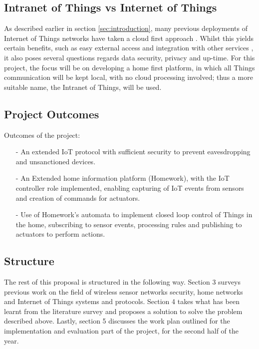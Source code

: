 \documentclass{mprop}
\begin{document}
\subsection{Intranet of Things vs Internet of Things} %
\label{sub:intranet_of_things}

As described earlier in section \ref{sec:introduction}, many previous deployments of Internet of Things networks have taken a cloud first approach \cite{SmartThings, Twine}. Whilst this yields certain benefits, such as easy external access and integration with other services \cite{IFTTT, Xively}, it also poses several questions regards data security, privacy and up-time. For this project, the focus will be on developing a home first platform, in which all Things communication will be kept local, with no cloud processing involved; thus a more suitable name, the Intranet of Things, will be used. 

\subsection{Project Outcomes} %
\label{sub:project_outcomes}

Outcomes of the project:
\begin{itemize}
  \item[-] An extended IoT protocol with sufficient security to prevent eavesdropping and unsanctioned devices.
  \item[-] An Extended home information platform (Homework), with the IoT controller role implemented, enabling capturing of IoT events from sensors and creation of commands for actuators.
  \item[-] Use of Homework's automata to implement closed loop control of Things in the home, subscribing to sensor events, processing rules and publishing to actuators to perform actions.
\end{itemize}


\subsection{Structure} %
\label{sub:structure}
The rest of this proposal is structured in the following way. Section 3 surveys previous work on the field of wireless sensor networks security, home networks and Internet of Things systems and protocols. Section 4 takes what has been learnt from the literature survey and proposes a solution to solve the problem described above. Lastly, section 5 discusses the work plan outlined for the implementation and evaluation part of the project, for the second half of the year.
\end{document}

